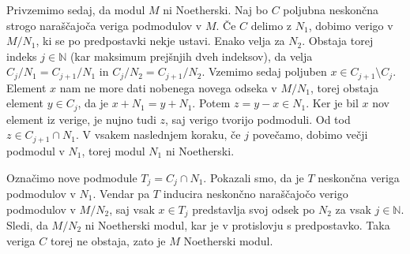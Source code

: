 \documentclass[a4paper, 12pt]{article}
\newcommand{\N}{\mathbb{N}}
\begin{document}
Privzemimo sedaj, da modul $M$ ni Noetherski. Naj bo $C$ poljubna neskončna strogo naraščajoča veriga podmodulov v $M$. Če $C$ delimo z $N_1$, dobimo verigo v $M/N_1$, ki se po predpostavki nekje ustavi. Enako velja za $N_2$. Obstaja torej indeks $j \in \N$ (kar maksimum prejšnjih dveh indeksov), da velja $C_j/N_1 = C_{j+1}/N_1$ in $C_j/N_2 = C_{j+1}/N_2$. Vzemimo sedaj poljuben $x \in C_{j+1}\setminus C_j$. Element $x$ nam ne more dati nobenega novega odseka v $M/N_1$, torej obstaja element $y \in C_j$, da je $x + N_1 = y + N_1$. Potem $z = y - x \in N_1$. Ker je bil $x$ nov element iz verige, je nujno tudi $z$, saj verigo tvorijo podmoduli. Od tod $z \in C_{j+1} \cap N_1$. V vsakem naslednjem koraku, če $j$ povečamo, dobimo večji podmodul v $N_1$, torej modul $N_1$ ni Noetherski.

Označimo nove podmodule $T_j = C_j \cap N_1$. Pokazali smo, da je $T$ neskončna veriga podmodulov v $N_1$. Vendar pa $T$ inducira neskončno naraščajočo verigo podmodulov v $M/N_2$, saj vsak $x \in T_j$ predstavlja svoj odsek po $N_2$ za vsak $j \in \N$.
Sledi, da $M/N_2$ ni Noetherski modul, kar je v protislovju s predpostavko. Taka veriga $C$ torej ne obstaja, zato je $M$ Noetherski modul.
\end{document}

